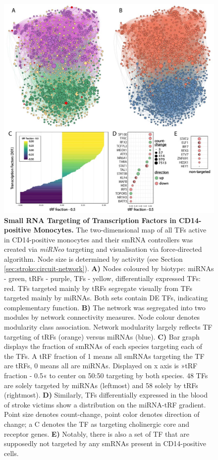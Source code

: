 \begin{figure}
\includegraphics[width=\textwidth]{figures/smrna-tf-network-fractions}
\caption[Small RNA Targeting of Transcription Factors in CD14-positive Monocytes.]{\textbf{Small RNA Targeting of Transcription Factors in CD14-positive Monocytes.} The two-dimensional map of all TFs active in CD14-positive monocytes and their smRNA controllers was created via \emph{miRNeo} targeting and visualisation via force-directed algorithm. Node size is determined by activity (see Section \ref{sec:stroke:circuit-network}). \textbf{A)} Nodes coloured by biotype: miRNAs - green, tRFs - purple, TFs - yellow, differentially expressed TFs: red. TFs targeted mainly by tRFs segregate visually from TFs targeted mainly by miRNAs. Both sets contain DE TFs, indicating complementary function. \textbf{B)} The network was segregated into two modules by network connectivity measures. Node colour denotes modularity class association. Network modularity largely reflects TF targeting of tRFs (orange) versus miRNAs (blue). \textbf{C)} Bar graph displays the fraction of smRNAs of each species targeting each of the TFs. A tRF fraction of 1 means all smRNAs targeting the TF are tRFs, 0 means all are miRNAs. Displayed on x axis is »tRF fraction - 0.5« to center on 50:50 targeting by both species. 48 TFs are solely targeted by miRNAs (leftmost) and 58 solely by tRFs (rightmost). \textbf{D)} Similarly, TFs differentially expressed in the blood of stroke victims show a distribution on the miRNA-tRF gradient. Point size denotes count-change, point color denotes direction of change; a C denotes the TF as targeting cholinergic core and receptor genes. \textbf{E)} Notably, there is also a set of TF that are supposedly not targeted by any smRNAs present in CD14-positive cells.
\label{fig:smrna-tf-network-fractions}}
\end{figure}

